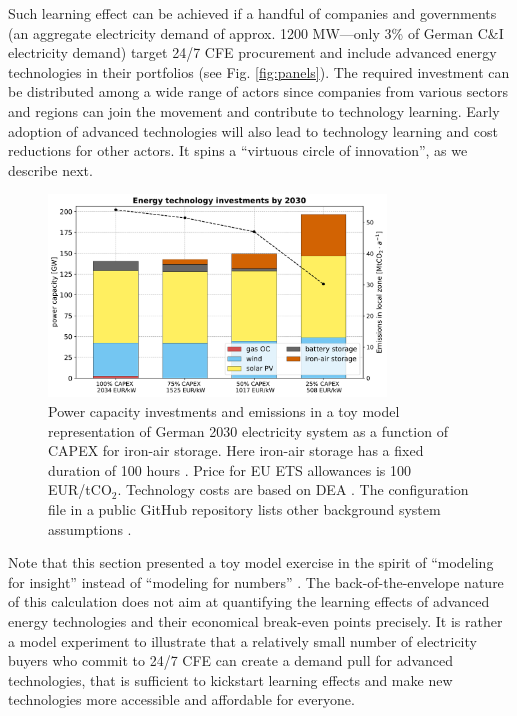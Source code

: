 \documentclass[pdflatex,sn-basic, Numbered]{sn-jnl}
\theoremstyle{thmstyleone}%
\theoremstyle{thmstyletwo}%
\theoremstyle{thmstylethree}%
\begin{document}
Such learning effect can be achieved if a handful of companies and governments (an aggregate electricity demand of approx. 1200 MW---only 3\% of German C\&I electricity demand) target 24/7 CFE procurement and include advanced energy technologies in their portfolios (see Fig. \ref{fig:panels}). The required investment can be distributed among a wide range of actors since companies from various sectors and regions can join the movement and contribute to technology learning. Early adoption of advanced technologies will also lead to technology learning and cost reductions for other actors. It spins a \enquote{virtuous circle of innovation}, as we describe next.

\begin{figure}[htbp]
    \centering
    \includegraphics[width=0.8\textwidth]{images/dashboard_3.pdf}
    \caption{Power capacity investments and emissions in a toy model representation of German 2030 electricity system as a function of CAPEX for iron-air storage. Here iron-air storage has a fixed duration of 100 hours \cite{FormEnergyLatest2024}. Price for EU ETS allowances is 100 EUR/tCO$_2$. Technology costs are based on DEA \cite{DEA-technologydata}. The configuration file in a public GitHub repository lists other background system assumptions \cite{code247CFE}.}\label{fig:impact}
\end{figure}

Note that this section presented a toy model exercise in the spirit of \enquote{modeling for insight} instead of \enquote{modeling for numbers} \cite{huntingtonModelingInsightsNot1982}. The back-of-the-envelope nature of this calculation does not aim at quantifying the learning effects of advanced energy technologies and their economical break-even points precisely.
It is rather a model experiment to illustrate that a relatively small number of electricity buyers who commit to 24/7 CFE can create a demand pull for advanced technologies, that is sufficient to kickstart learning effects and make new technologies more accessible and affordable for everyone.
\end{document}
